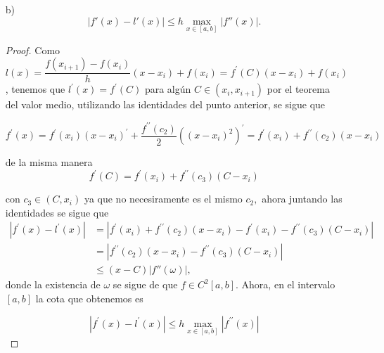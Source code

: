 \begin{itemize}
\begin{proof}
        $$|f(x)-l(x)|\leq=\frac{h^2}{2}\max_{x\in [a,b]}|f^{\prime\prime}(x)|$$
    \end{proof}

    \item[b)] $$|f'(x) - l'(x)| \leq h \max_{x \in [a,b]} |f''(x)|.$$

    \begin{proof}
        Como $l(x)=\dfrac{f(x_{i+1})-f(x_i)}{h}(x-x_i)+f(x_i)=f^{\prime}(C)(x-x_i)+f(x_i)$, tenemos que $l^{\prime}(x)=f^{\prime}(C)$ para algún $C\in (x_i,x_{i+1})$ por el teorema del valor medio, utilizando las identidades del punto anterior, se sigue que

        $$f^{\prime}(x)=f^{\prime}(x_i)(x-x_i)^{\prime}+\frac{f^{\prime\prime}(c_2)}{2}((x-x_i)^2)^{\prime}=f^{\prime}(x_i)+f^{\prime\prime}(c_2)(x-x_i)$$

        de la misma manera
        $$f^{\prime}(C)=f^{\prime}(x_i)+f^{\prime\prime}(c_3)(C-x_i)$$

        con $c_3\in (C,x_i)$ ya que no necesiramente es el mismo $c_2,$ ahora juntando las identidades se sigue que 
        \begin{align*}
            |f^{\prime}(x)-l^{\prime}(x)|&=|f^{\prime}(x_i)+f^{\prime\prime}(c_2)(x-x_i)-f^{\prime}(x_i)-f^{\prime\prime}(c_3)(C-x_i)|\\
            &=|f^{\prime\prime}(c_2)(x-x_i)-f^{\prime\prime}(c_3)(C-x_i)|\\
            &\leq (x-C) |f''(\omega)|
        ,\end{align*}
donde la existencia de $\omega$ se sigue de que $f\in C^2[a,b]$. Ahora, en el intervalo $[a,b]$ la cota que obtenemos es

$$|f^{\prime}(x)-l^{\prime}(x)|\leq h\max_{x\in [a,b]}|f^{\prime\prime}(x)|$$
    \end{proof}
\end{itemize}